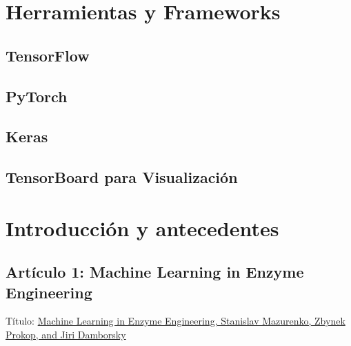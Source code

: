 \documentclass[12pt]{article}
\begin{document}
\section{Herramientas y Frameworks}


\subsection{TensorFlow}
\newpage
\subsection{PyTorch}
\newpage
\subsection{Keras}
\newpage
\subsection{TensorBoard para Visualización}
\newpage

\section{Introducci\'on y antecedentes}


\subsection{Artículo 1: Machine Learning in Enzyme Engineering}
Título: \href{https://pubs.acs.org/doi/full/10.1021/acscatal.9b04321}{Machine Learning in Enzyme Engineering, Stanislav Mazurenko, Zbynek Prokop, and Jiri Damborsky} \cite{Mazurenko}
\end{document}
